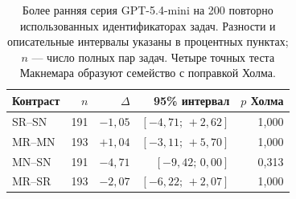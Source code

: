 \begin{table}[H]
\caption{Более ранняя серия GPT-5.4-mini на 200 повторно использованных идентификаторах задач. Разности и описательные интервалы указаны в процентных пунктах; $n$ --- число полных пар задач. Четыре точных теста Макнемара образуют семейство с поправкой Холма.}
\label{tab:mini-validation}
\centering\small
\begin{tabular}{@{}lrrrr@{}}
\toprule
Контраст & $n$ & $\Delta$ & 95\% интервал & $p$ Холма\\
\midrule
SR--SN & 191 & $-1{,}05$ & $[-4{,}71;\,+2{,}62]$ & 1,000\\
MR--MN & 193 & $+1{,}04$ & $[-3{,}11;\,+5{,}70]$ & 1,000\\
MN--SN & 191 & $-4{,}71$ & $[-9{,}42;\,0{,}00]$ & 0,313\\
MR--SR & 193 & $-2{,}07$ & $[-6{,}22;\,+2{,}07]$ & 1,000\\
\bottomrule
\end{tabular}
\end{table}

